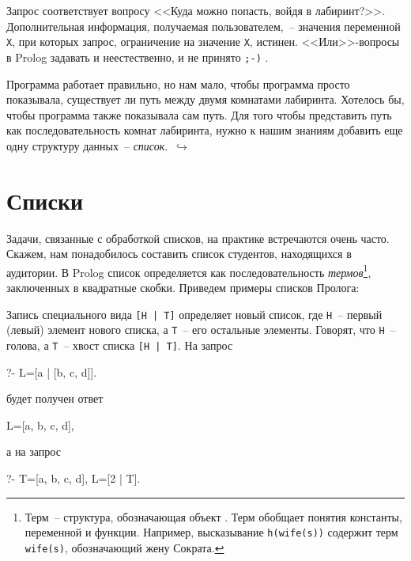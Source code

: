 \documentclass[a4paper,14pt, openany, twoside, draft]{extbook} %
\newcommand{\goforth}[1]{$\,\hookrightarrow$\pageref{#1}}
\begin{document}
Запрос соответствует вопросу <<Куда можно попасть, войдя в лабиринт?>>.  Дополнительная информация, получаемая пользователем,~-- значения переменной \texttt{X}, при которых запрос, ограничение на значение \texttt{X}, истинен.  <<Или>>-вопросы в Prolog задавать и неестественно, и не принято \texttt{;-)} .

Программа работает правильно, но нам мало, чтобы программа просто показывала, существует ли путь между двумя комнатами лабиринта.  Хотелось бы, чтобы программа также показывала сам путь.  Для того чтобы представить путь как последовательность комнат лабиринта, нужно к нашим знаниям добавить еще одну структуру данных~-- \emph{список}. \goforth{par:mazelist}

\section{Списки}

Задачи, связанные с обработкой списков, на практике встречаются очень часто. Скажем, нам понадобилось составить список студентов, находящихся в аудитории.  В Prolog список определяется как последовательность \emph{термов}\footnote{Терм~-- структура, обозначающая объект \cite{AppLog}.  Терм обобщает понятия константы, переменной и функции.  Например, высказывание \texttt{h(wife(s))} содержит терм \texttt{wife(s)}, обозначающий жену Сократа.}, заключенных в квадратные скобки.  Приведем примеры списков Пролога:

\begin{proexp}
\end{proexp}

  Запись специального вида {\tt [H | T]} определяет новый список, где {\tt Н}~-- первый (левый) элемент нового списка, а {\tt Т}~-- его остальные элементы.  Говорят, что {\tt Н}~-- голова, а {\tt Т}~-- хвост списка {\tt [H | T]}. На запрос

\begin{proexp}
?- L=[a | [b, c, d]].
\end{proexp}

\noindent будет получен ответ

\begin{proexp}
L=[a, b, c, d],
\end{proexp}

\noindent а на запрос

\begin{proexp}
?- T=[a, b, c, d], L=[2 | T].
\end{proexp}
\end{document}
